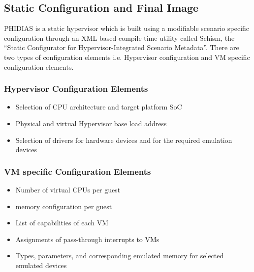 \subsection{Static Configuration and Final Image}
PHIDIAS is a static hypervisor which is built using a modifiable scenario specific configuration through an XML based compile time utility called Schism, the “Static Configurator for Hypervisor-Integrated Scenario
Metadata”. There are two types of configuration elements i.e. Hypervisor configuration and VM specific configuration elements.
\subsubsection{Hypervisor Configuration Elements}
\begin{itemize}
	\item Selection of CPU architecture and target platform SoC
	\item Physical and virtual Hypervisor base load address
	\item Selection of drivers for hardware devices and for the required emulation devices
\end{itemize}
\subsubsection{VM specific Configuration Elements}
\begin{itemize}
	\item Number of virtual CPUs per guest
	\item memory configuration per guest
	\item List of capabilities of each VM
	\item Assignments of pass-through interrupts to VMs
	\item Types, parameters, and corresponding emulated memory for selected emulated devices
\end{itemize}

